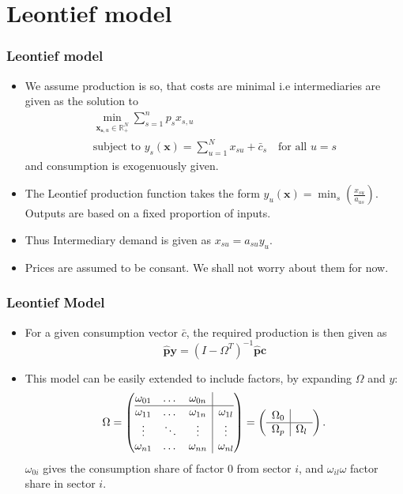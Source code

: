 \documentclass[utf8,aspectratio=169,ngerman,english]{beamer}
\newcommand{\hbf}[1]{\hat {\mathbf #1}}
\begin{document}
\section{Leontief model}
\begin{frame} 
  \frametitle{Leontief model}
  \begin{itemize}
    \item  We assume production is so, that costs are minimal i.e intermediaries are given as the solution to
      \begin{gather}
          \label{eq:costmin}
          \min_{\mathbf x_{\mathbf s, u} \in \mathbb R^N_+} \sum_{s=1}^n p_s x_{s,u} \\
          \text{subject to }  y_s(\mathbf x) = \sum_{u=1}^N x_{su} + \bar c_ s \quad \text{for all } u=s
      \end{gather}
    and consumption is exogenuously given.
    \item The Leontief production function takes the form $y_u(\mathbf x) = \min_{s}(\frac{x_{su}}{a_{us}})$. Outputs are based on a fixed proportion of inputs.
    \item Thus Intermediary demand is given as $x_{su} = a_{su} y_u$.
    \item Prices are assumed to be consant. We shall not worry about them for now.
  \end{itemize}
\end{frame}

\begin{frame}
\frametitle{Leontief Model}
\begin{itemize}
  \item For a given consumption vector $\bar c$, the required production is then given as 
    $$\hbf p \mathbf y = (I - \Omega^T)^{-1}  \hbf p \mathbf c$$
  \item This model can be easily extended to include factors, by expanding $\Omega$ and $y$:
\begin{align}
  \label{eq:iomatrix}
  \Omega = \left( \begin{array}{@{}ccc|c@{}}
    \omega_{01} &\dots &\omega_{0n} &  \\ \hline
    \omega_{11} & \dots &\omega_{1n} & \omega_{1l}\\ 
    \vdots &\ddots &\vdots & \vdots\\ 
    \omega_{n1} & \dots & \omega_{nn} & \omega_{nl}    
    \end{array} \right) = 
    \left( \begin{array}{c|c}
    \Omega_0 & \\ \hline
    \Omega_p & \Omega_l\\ 
  \end{array} \right).
\end{align}
$\omega_{0i}$ gives the consumption share of factor $0$ from sector $i$, and $\omega_{il}ω$ factor share in sector $i$. 
\end{itemize}
\end{frame}
\end{document}
